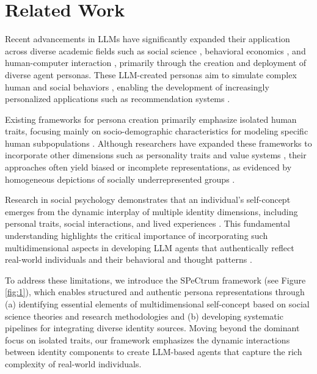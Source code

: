 \section{Related Work}

Recent advancements in LLMs have significantly expanded their application across diverse academic fields such as social science \citep{aher_using_2023, gao_s3_2023}, behavioral economics \citep{horton_large_2023}, and human-computer interaction \citep{hamalainen_evaluating_2023}, primarily through the creation and deployment of diverse agent personas. These LLM-created personas aim to simulate complex human and social behaviors \citep{park_social_2022, park_generative_2023}, enabling the development of increasingly personalized applications such as recommendation systems \citep{wang_user_2023}.

Existing frameworks for persona creation primarily emphasize isolated human traits, focusing mainly on socio-demographic characteristics \citep{chen_empathy_2024, zhang_speechagents_2024, chuang-etal-2024-simulating} for modeling specific human subpopulations \citep{argyle_out_2023}. Although researchers have expanded these frameworks to incorporate other dimensions such as personality traits \citep{jiang-etal-2024-personallm, liu2024skepticism, xie_human_2024, yuan_evaluating_2024} and value systems \citep{zhou_sotopia_2024, xie2024largelanguagemodelagents, kang_values_2023}, their approaches often yield biased or incomplete representations, as evidenced by homogeneous depictions of socially underrepresented groups \citep{petrov_limited_2024, gupta_bias_2023, deusex_2024, cheng_compost_2023, lee_large_2024}.

Research in social psychology demonstrates that an individual's self-concept emerges from the dynamic interplay of multiple identity dimensions, including personal traits, social interactions, and lived experiences \citep{mead1934mind}. This fundamental understanding highlights the critical importance of incorporating such multidimensional aspects in developing LLM agents that authentically reflect real-world individuals and their behavioral and thought patterns \citep{xiao_how_2023}.

To address these limitations, we introduce the SPeCtrum framework (see Figure \ref{fig:1}), which enables structured and authentic persona representations through (a) identifying essential elements of multidimensional self-concept based on social science theories and research methodologies and (b) developing systematic pipelines for integrating diverse identity sources. Moving beyond the dominant focus on isolated traits, our framework emphasizes the dynamic interactions between identity components to create LLM-based agents that capture the rich complexity of real-world individuals.

